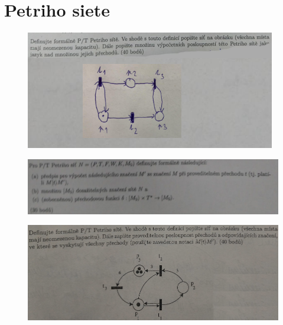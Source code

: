 \documentclass[]{article}
\begin{document}
	\section{Petriho siete}
	
	\begin{figure}[H]
		\includegraphics[width=\textwidth]{tasks/petri/task1.png}
	\end{figure}

	\begin{figure}[H]
		\includegraphics[width=\textwidth]{tasks/petri/task2.png}
	\end{figure}

	\begin{figure}[H]
		\includegraphics[width=\textwidth]{tasks/petri/task3.png}
	\end{figure}

	
\end{document}
